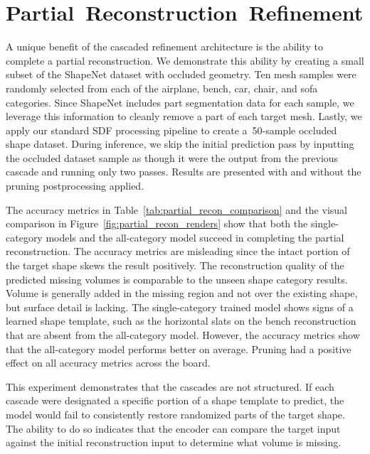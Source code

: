 \section{Partial~Reconstruction~Refinement}
\label{sec:partial_recon_experiment}

A unique benefit of the cascaded refinement architecture is the ability to complete a partial reconstruction. We demonstrate this ability by creating a small subset of the ShapeNet dataset with occluded geometry. Ten mesh samples were randomly selected from each of the airplane, bench, car, chair, and sofa categories. Since ShapeNet includes part segmentation data for each sample, we leverage this information to cleanly remove a part of each target mesh. Lastly, we apply our standard SDF processing pipeline to create a~50-sample occluded shape dataset. During inference, we skip the initial prediction pass by inputting the occluded dataset sample as though it were the output from the previous cascade and running only two passes. Results are presented with and without the pruning postprocessing applied.

The accuracy metrics in Table~\ref{tab:partial_recon_comparison} and the visual comparison in Figure~\ref{fig:partial_recon_renders} show that both the single-category models and the all-category model succeed in completing the partial reconstruction. The accuracy metrics are misleading since the intact portion of the target shape skews the result positively. The reconstruction quality of the predicted missing volumes is comparable to the unseen shape category results. Volume is generally added in the missing region and not over the existing shape, but surface detail is lacking. The single-category trained model shows signs of a learned shape template, such as the horizontal slats on the bench reconstruction that are absent from the all-category model. However, the accuracy metrics show that the all-category model performs better on average. Pruning had a positive effect on all accuracy metrics across the board.

This experiment demonstrates that the cascades are not structured. If each cascade were designated a specific portion of a shape template to predict, the model would fail to consistently restore randomized parts of the target shape. The ability to do so indicates that the encoder can compare the target input against the initial reconstruction input to determine what volume is missing.


